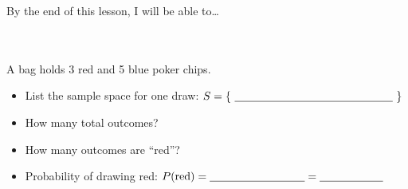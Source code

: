 \documentclass[10pt]{article}
\begin{document}
\namedateperiod

\vspace{0.12in}

\begin{objectivebox}
\small By the end of this lesson, I will be able to\dots\\[4pt]
\writeline\\[1pt]
\writeline\\[1pt]
\writeline
\end{objectivebox}

\vspace{0.1in}

\begin{vocabbox}
\end{vocabbox}

\vspace{0.1in}

\begin{hookbox}
\small A bag holds 3 red and 5 blue poker chips.
\begin{itemize}[itemsep=3pt]
  \item List the sample space for one draw: $S = \{\ \blank{5cm}\ \}$
  \item How many total outcomes? \blank{2cm}
  \item How many outcomes are ``red''? \blank{2cm}
  \item Probability of drawing red: $P(\text{red}) = \blank{3cm} = \blank{2cm}$
\end{itemize}
\end{hookbox}

\vspace{0.1in}
\end{document}
